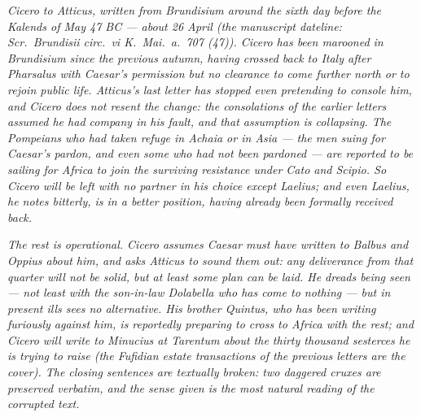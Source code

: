 
\textit{Cicero to Atticus, written from Brundisium around
the sixth day before the Kalends of May 47 BC --- about
26 April (the manuscript dateline: \textit{Scr.\ Brundisii
circ.\ vi K.\ Mai.\ a.\ 707 (47)}). Cicero has been
marooned in Brundisium since the previous autumn,
having crossed back to Italy after Pharsalus with
Caesar's permission but no clearance to come further
north or to rejoin public life. Atticus's last letter
has stopped even pretending to console him, and Cicero
does not resent the change: the consolations of the
earlier letters assumed he had company in his fault,
and that assumption is collapsing. The Pompeians who
had taken refuge in Achaia or in Asia --- the men
suing for Caesar's pardon, and even some who had not
been pardoned --- are reported to be sailing for
Africa to join the surviving resistance under Cato
and Scipio. So Cicero will be left with no partner in
his choice except Laelius; and even Laelius, he notes
bitterly, is in a better position, having already been
formally received back.}

\textit{The rest is operational. Cicero assumes Caesar
must have written to Balbus and Oppius about him, and
asks Atticus to sound them out: any deliverance from
that quarter will not be solid, but at least some plan
can be laid. He dreads being seen --- not least with
the son-in-law Dolabella who has come to nothing ---
but in present ills sees no alternative. His brother
Quintus, who has been writing furiously against him,
is reportedly preparing to cross to Africa with the
rest; and Cicero will write to Minucius at Tarentum
about the thirty thousand sesterces he is trying to
raise (the Fufidian estate transactions of the
previous letters are the cover). The closing
sentences are textually broken: two daggered cruxes
are preserved verbatim, and the sense given is the
most natural reading of the corrupted text.}
